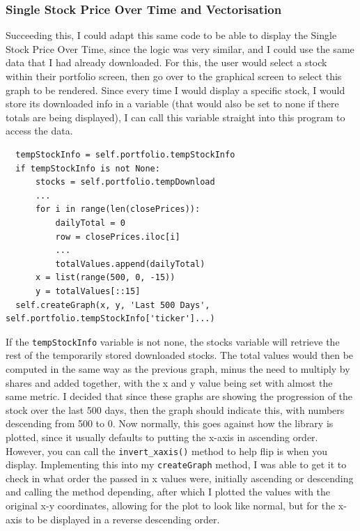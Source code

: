 \documentclass{article}
\begin{document}
\subsubsection{Single Stock Price Over Time and Vectorisation}
Succeeding this, I could adapt this same code to be able to display the Single Stock Price Over Time, since the logic was very similar, and I could use the same data that I had already downloaded. For this, the user would select a stock within their portfolio screen, then go over to the graphical screen to select this graph to be rendered. Since every time I would display a specific stock, I would store its downloaded info in a variable (that would also be set to none if there totals are being displayed),  I can call this variable straight into this program to access the data.\\\vspace{0.3cm}
\newpage
\begin{verbatim}
  tempStockInfo = self.portfolio.tempStockInfo
  if tempStockInfo is not None:
      stocks = self.portfolio.tempDownload
      ...
      for i in range(len(closePrices)):
          dailyTotal = 0
          row = closePrices.iloc[i]
          ...
          totalValues.append(dailyTotal)
      x = list(range(500, 0, -15)) 
      y = totalValues[::15]
  self.createGraph(x, y, 'Last 500 Days', self.portfolio.tempStockInfo['ticker']...)
\end{verbatim}

\vspace{0.3cm}
If the \texttt{tempStockInfo} variable is not none, the stocks variable will retrieve the rest of the temporarily stored downloaded stocks. The total values would then be computed in the same way as the previous graph, minus the need to multiply by shares and added together, with the x and y value being set with almost the same metric. I decided that since these graphs are showing the progression of the stock over the last 500 days, then the graph should indicate this, with numbers descending from 500 to 0. Now normally, this goes against how the library is plotted, since it usually defaults to putting the x-axis in ascending order. However, you can call the \texttt{invert\_xaxis()} method to help flip is when you display. Implementing this into my \texttt{createGraph} method, I was able to get it to check in what order the passed in x values were, initially ascending or descending and calling the method depending, after which I plotted the values with the original x-y coordinates, allowing for the plot to look like normal, but for the x-axis to be displayed in a reverse descending order.\\\vspace{0.3cm}
\end{document}

